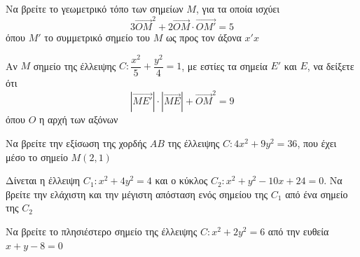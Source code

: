 \documentclass{presentation}
\begin{document}
\begin{askisi}
  Να βρείτε το γεωμετρικό τόπο των σημείων $Μ$, για τα οποία ισχύει
  $$3\overrightarrow{OM}^2+2\overrightarrow{OM}\cdot \overrightarrow{OM'}=5$$
  όπου $M'$ το συμμετρικό σημείο του $M$ ως προς τον άξονα $x'x$


\end{askisi}

\begin{askisi}
  Αν $Μ$ σημείο της έλλειψης $C:\dfrac{x^2}{5}+\dfrac{y^2}{4}=1$, με εστίες τα σημεία $Ε'$ και $Ε$, να δείξετε ότι
  $$|\overrightarrow{ΜΕ'}|\cdot |\overrightarrow{ΜΕ}|+\overrightarrow{ΟΜ}^2=9$$
  όπου $Ο$ η αρχή των αξόνων


\end{askisi}

\begin{askisi}
  Να βρείτε την εξίσωση της χορδής $ΑΒ$ της έλλειψης $C:4x^2+9y^2=36$, που έχει μέσο το σημείο $Μ(2,1)$


\end{askisi}

\begin{askisi}
  Δίνεται η έλλειψη $C_1:x^2+4y^2=4$ και ο κύκλος $C_2:x^2+y^2-10x+24=0$. Να βρείτε την ελάχιστη και την μέγιστη απόσταση ενός σημείου της $C_1$ από ένα σημείο της $C_2$


\end{askisi}

\begin{askisi}
  Να βρείτε το πλησιέστερο σημείο της έλλειψης $C:x^2+2y^2=6$ από την ευθεία $x+y-8=0$


\end{askisi}

\appendix

\section{}
\end{document}
